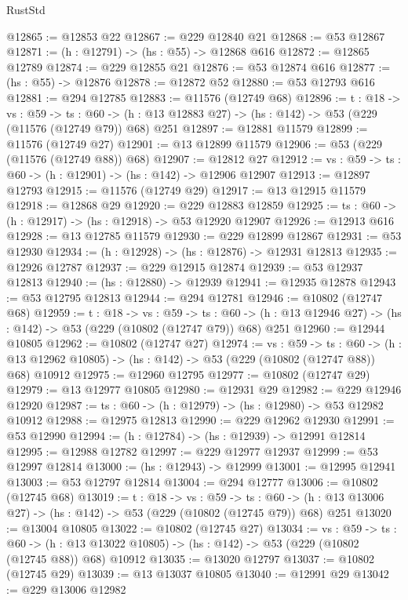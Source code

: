 \begin{lexlean}{RustStd}
\begin{coremodule}
@12865 := @12853 @22
@12867 := @229 @12840 @21
@12868 := @53 @12867
@12871 := (h : @12791) -> (hs : @55) -> @12868 @616
@12872 := @12865 @12789
@12874 := @229 @12855 @21
@12876 := @53 @12874 @616
@12877 := (hs : @55) -> @12876
@12878 := @12872 @52
@12880 := @53 @12793 @616
@12881 := @294 @12785
@12883 := @11576 (@12749 @68)
@12896 := {t : @18} ->
  {vs : @59} ->
  {ts : @60} -> (h : @13 @12883 @27) -> (hs : @142) -> @53 (@229 (@11576 (@12749 @79)) @68) @251
@12897 := @12881 @11579
@12899 := @11576 (@12749 @27)
@12901 := @13 @12899 @11579
@12906 := @53 (@229 (@11576 (@12749 @88)) @68)
@12907 := @12812 @27
@12912 := {vs : @59} -> {ts : @60} -> (h : @12901) -> (hs : @142) -> @12906 @12907
@12913 := @12897 @12793
@12915 := @11576 (@12749 @29)
@12917 := @13 @12915 @11579
@12918 := @12868 @29
@12920 := @229 @12883 @12859
@12925 := {ts : @60} -> (h : @12917) -> (hs : @12918) -> @53 @12920 @12907
@12926 := @12913 @616
@12928 := @13 @12785 @11579
@12930 := @229 @12899 @12867
@12931 := @53 @12930
@12934 := (h : @12928) -> (hs : @12876) -> @12931 @12813
@12935 := @12926 @12787
@12937 := @229 @12915 @12874
@12939 := @53 @12937 @12813
@12940 := (hs : @12880) -> @12939
@12941 := @12935 @12878
@12943 := @53 @12795 @12813
@12944 := @294 @12781
@12946 := @10802 (@12747 @68)
@12959 := {t : @18} ->
  {vs : @59} ->
  {ts : @60} -> (h : @13 @12946 @27) -> (hs : @142) -> @53 (@229 (@10802 (@12747 @79)) @68) @251
@12960 := @12944 @10805
@12962 := @10802 (@12747 @27)
@12974 := {vs : @59} ->
  {ts : @60} ->
  (h : @13 @12962 @10805) -> (hs : @142) -> @53 (@229 (@10802 (@12747 @88)) @68) @10912
@12975 := @12960 @12795
@12977 := @10802 (@12747 @29)
@12979 := @13 @12977 @10805
@12980 := @12931 @29
@12982 := @229 @12946 @12920
@12987 := {ts : @60} -> (h : @12979) -> (hs : @12980) -> @53 @12982 @10912
@12988 := @12975 @12813
@12990 := @229 @12962 @12930
@12991 := @53 @12990
@12994 := (h : @12784) -> (hs : @12939) -> @12991 @12814
@12995 := @12988 @12782
@12997 := @229 @12977 @12937
@12999 := @53 @12997 @12814
@13000 := (hs : @12943) -> @12999
@13001 := @12995 @12941
@13003 := @53 @12797 @12814
@13004 := @294 @12777
@13006 := @10802 (@12745 @68)
@13019 := {t : @18} ->
  {vs : @59} ->
  {ts : @60} -> (h : @13 @13006 @27) -> (hs : @142) -> @53 (@229 (@10802 (@12745 @79)) @68) @251
@13020 := @13004 @10805
@13022 := @10802 (@12745 @27)
@13034 := {vs : @59} ->
  {ts : @60} ->
  (h : @13 @13022 @10805) -> (hs : @142) -> @53 (@229 (@10802 (@12745 @88)) @68) @10912
@13035 := @13020 @12797
@13037 := @10802 (@12745 @29)
@13039 := @13 @13037 @10805
@13040 := @12991 @29
@13042 := @229 @13006 @12982

\end{coremodule}
\end{lexlean}
